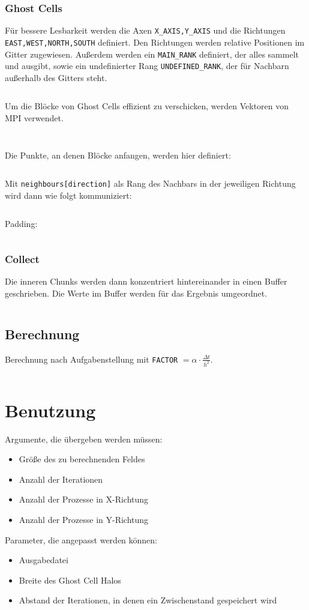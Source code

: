 \documentclass[12pt]{article}
\begin{document}
\subsubsection{Ghost Cells}
Für bessere Lesbarkeit werden die Axen \verb+X_AXIS,Y_AXIS+ und die Richtungen \verb+EAST,WEST,NORTH,SOUTH+ definiert. Den Richtungen werden relative Positionen im Gitter zugewiesen. Außerdem werden ein \verb+MAIN_RANK+ definiert, der alles sammelt und ausgibt, sowie ein undefinierter Rang \verb+UNDEFINED_RANK+, der für Nachbarn außerhalb des Gitters steht.
\inputminted[fontsize=\scriptsize, firstline=31, lastline=57]{C}{../src/waermeleitung.h}
Um die Blöcke von Ghost Cells effizient zu verschicken, werden Vektoren von MPI verwendet.
\inputminted[fontsize=\scriptsize, firstline=60, lastline=71]{C}{../src/waermeleitung.cpp}
\inputminted[fontsize=\scriptsize, firstline=3, lastline=16]{C}{../src/comms.cpp}
Die Punkte, an denen Blöcke anfangen, werden hier definiert:
\inputminted[fontsize=\scriptsize, firstline=18, lastline=29]{C}{../src/comms.cpp}
Mit \verb+neighbours[direction]+ als Rang des Nachbars in der jeweiligen Richtung wird dann wie folgt kommuniziert:
\inputminted[fontsize=\scriptsize, firstline=59, lastline=80]{C}{../src/comms.cpp}
Padding:
\inputminted[fontsize=\scriptsize, firstline=31, lastline=57]{C}{../src/comms.cpp}
\subsubsection{Collect}
Die inneren Chunks werden dann konzentriert hintereinander in einen Buffer geschrieben. Die Werte im Buffer werden für das Ergebnis umgeordnet.
\inputminted[fontsize=\scriptsize, firstline=44, lastline=48]{C}{../src/print.cpp}

\subsection{Berechnung}
Berechnung nach Aufgabenstellung mit \verb+FACTOR+ $= \alpha \cdot \frac{\Delta t}{h^2}$.
\inputminted[fontsize=\scriptsize, firstline=135, lastline=142]{C}{../src/waermeleitung.cpp}


\clearpage
\section{Benutzung}
Argumente, die übergeben werden müssen:
\begin{itemize}
    \item Größe des zu berechnenden Feldes
    \item Anzahl der Iterationen
    \item Anzahl der Prozesse in X-Richtung
    \item Anzahl der Prozesse in Y-Richtung
\end{itemize}
Parameter, die angepasst werden können:
\begin{itemize}
    \item Ausgabedatei
    \item Breite des Ghost Cell Halos
    \item Abstand der Iterationen, in denen ein Zwischenstand gespeichert wird
\end{itemize}
\end{document}
